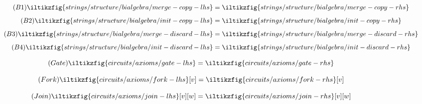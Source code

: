 \begin{figure}
\begin{minipage}{0.3\textwidth}
\begin{align}
            \label{eq:monoid-commutativity}
        \end{align}
    \end{minipage}
    \begin{minipage}{0.3\textwidth}
        \begin{align}
            \tag{\(\mathsf{B1}\)}
            \iltikzfig{strings/structure/bialgebra/merge-copy-lhs}
            &=
            \iltikzfig{strings/structure/bialgebra/merge-copy-rhs}
            \label{eq:bialgebra-merge-copy}
            \\[0.5em]
            \tag{\(\mathsf{B2}\)}
            \iltikzfig{strings/structure/bialgebra/init-copy-lhs}
            &=
            \iltikzfig{strings/structure/bialgebra/init-copy-rhs}
            \label{eq:bialgebra-init-copy}
            \\[0.5em]
            \tag{\(\mathsf{B3}\)}
            \iltikzfig{strings/structure/bialgebra/merge-discard-lhs}
            &=
            \iltikzfig{strings/structure/bialgebra/merge-discard-rhs}
            \label{eq:bialgebra-merge-discard}
            \\[0.5em]
            \tag{\(\mathsf{B4}\)}
            \iltikzfig{strings/structure/bialgebra/init-discard-lhs}
            &=
            \iltikzfig{strings/structure/bialgebra/init-discard-rhs}
            \label{eq:bialgebra-init-discard}
        \end{align}
    \end{minipage}
    \begin{minipage}[b]{0.28\textwidth}
        \begin{equation}
            \tag{\(\mathsf{Gate}\)}
            \iltikzfig{circuits/axioms/gate-lhs}
            =
            \iltikzfig{circuits/axioms/gate-rhs}
            \label{eq:gate}
        \end{equation}
    \end{minipage}%
    \begin{minipage}[b]{0.24\textwidth}
        \begin{equation}\textbf{}
            \tag{\(\mathsf{Fork}\)}
            \iltikzfig{circuits/axioms/fork-lhs}[v]
            =
            \iltikzfig{circuits/axioms/fork-rhs}[v]
            \label{eq:fork}
        \end{equation}
    \end{minipage}%
    \begin{minipage}[b]{0.25\textwidth}
        \begin{equation}
            \tag{\(\mathsf{Join}\)}
            \iltikzfig{circuits/axioms/join-lhs}[v][w]
            =
            \iltikzfig{circuits/axioms/join-rhs}[v][w]
            \label{eq:join}
        \end{equation}
    \end{minipage}


\end{figure}
